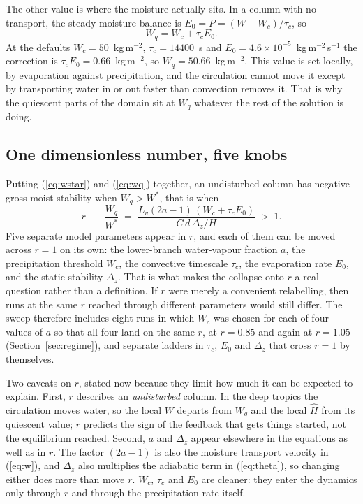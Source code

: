 \documentclass[11pt]{article}
\newcommand{\Hhat}{\hat{H}}
\newcommand{\Wstar}{W^{*}}
\newcommand{\Wq}{W_q}
\begin{document}
The other value is where the moisture actually sits. In a column with no
transport, the steady moisture balance is $E_0 = P = (W - W_c)/\tau_c$, so
\begin{equation}
\Wq = W_c + \tau_c E_0 .
\label{eq:wq}
\end{equation}
At the defaults $W_c = 50$~kg\,m$^{-2}$, $\tau_c = 14400$~s and
$E_0 = 4.6\times10^{-5}$~kg\,m$^{-2}$\,s$^{-1}$ the correction is
$\tau_c E_0 = 0.66$~kg\,m$^{-2}$, so $\Wq = 50.66$~kg\,m$^{-2}$. This value is
set locally, by evaporation against precipitation, and the circulation cannot
move it except by transporting water in or out faster than convection removes
it. That is why the quiescent parts of the domain sit at $\Wq$ whatever the rest
of the solution is doing.

\subsection{One dimensionless number, five knobs}

Putting (\ref{eq:wstar}) and (\ref{eq:wq}) together, an undisturbed column has
negative gross moist stability when $\Wq > \Wstar$, that is when
\begin{equation}
\boxed{\;
r \;\equiv\; \frac{\Wq}{\Wstar}
\;=\; \frac{L_v(2a-1)\,(W_c + \tau_c E_0)}{C\,d\,\Delta_z/H}
\;>\; 1 . \;}
\label{eq:r}
\end{equation}
Five separate model parameters appear in $r$, and each of them can be moved
across $r = 1$ on its own: the lower-branch water-vapour fraction $a$, the
precipitation threshold $W_c$, the convective timescale $\tau_c$, the
evaporation rate $E_0$, and the static stability $\Delta_z$. That is what makes
the collapse onto $r$ a real question rather than a definition. If $r$ were
merely a convenient relabelling, then runs at the same $r$ reached through
different parameters would still differ. The sweep therefore includes eight runs
in which $W_c$ was chosen for each of four values of $a$ so that all four land
on the same $r$, at $r = 0.85$ and again at $r = 1.05$
(Section~\ref{sec:regime}), and separate ladders in $\tau_c$, $E_0$ and
$\Delta_z$ that cross $r = 1$ by themselves.

Two caveats on $r$, stated now because they limit how much it can be expected
to explain. First, $r$ describes an \emph{undisturbed} column. In the deep
tropics the circulation moves water, so the local $W$ departs from $\Wq$ and the
local $\Hhat$ from its quiescent value; $r$ predicts the sign of the feedback
that gets things started, not the equilibrium reached. Second, $a$ and
$\Delta_z$ appear elsewhere in the equations as well as in $r$. The factor
$(2a-1)$ is also the moisture transport velocity in (\ref{eq:w}), and $\Delta_z$
also multiplies the adiabatic term in (\ref{eq:theta}), so changing either does
more than move $r$. $W_c$, $\tau_c$ and $E_0$ are cleaner: they enter the
dynamics only through $r$ and through the precipitation rate itself.
\end{document}
